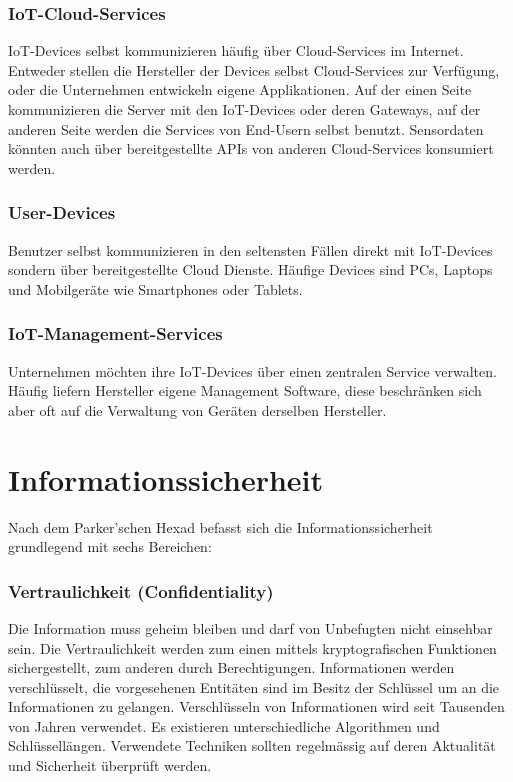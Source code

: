 \subsubsection{IoT-Cloud-Services}
IoT-Devices selbst kommunizieren häufig über Cloud-Services im Internet. Entweder stellen die Hersteller der Devices selbst Cloud-Services zur Verfügung, oder die Unternehmen entwickeln eigene Applikationen. Auf der einen Seite kommunizieren die Server mit den IoT-Devices oder deren Gateways, auf der anderen Seite werden die Services von End-Usern selbst benutzt. Sensordaten könnten auch über bereitgestellte APIs von anderen Cloud-Services konsumiert werden.

\subsubsection{User-Devices}
Benutzer selbst kommunizieren in den seltensten Fällen direkt mit IoT-Devices sondern über bereitgestellte Cloud Dienste. Häufige Devices sind PCs, Laptops und Mobilgeräte wie Smartphones oder Tablets.

\subsubsection{IoT-Management-Services}
Unternehmen möchten ihre IoT-Devices über einen zentralen Service verwalten. Häufig liefern Hersteller eigene Management Software, diese beschränken sich aber oft auf die Verwaltung von Geräten derselben Hersteller.
\newpage
\section{Informationssicherheit}
Nach dem Parker'schen Hexad befasst sich die Informationssicherheit grundlegend mit sechs Bereichen: \cite{ParkerianHexad}
\subsubsection{Vertraulichkeit (Confidentiality)}
Die Information muss geheim bleiben und darf von Unbefugten nicht einsehbar sein. Die Vertraulichkeit werden zum einen mittels kryptografischen Funktionen sichergestellt, zum anderen durch Berechtigungen. Informationen werden verschlüsselt, die vorgesehenen Entitäten sind im Besitz der Schlüssel um an die Informationen zu gelangen. Verschlüsseln von Informationen wird seit Tausenden von Jahren verwendet. Es existieren unterschiedliche Algorithmen und Schlüssellängen. Verwendete Techniken sollten regelmässig auf deren Aktualität und Sicherheit überprüft werden.
